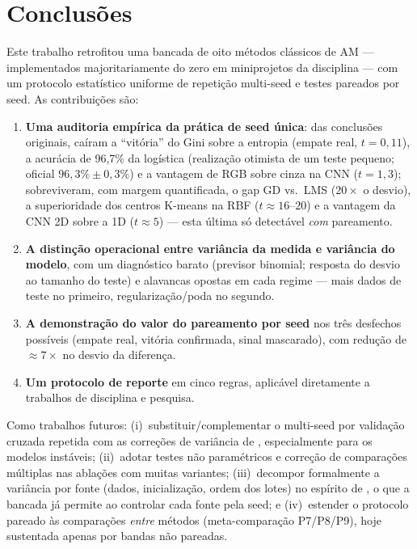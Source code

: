 \documentclass[12pt]{article}
\begin{document}
\section{Conclusões}\label{sec:conc}

Este trabalho retrofitou uma bancada de oito métodos clássicos de AM ---
implementados majoritariamente do zero em miniprojetos da disciplina --- com
um protocolo estatístico uniforme de repetição multi-seed e testes pareados
por seed. As contribuições são:

\begin{enumerate}
  \item \textbf{Uma auditoria empírica da prática de seed única}: das
        conclusões originais, caíram a ``vitória'' do Gini sobre a entropia
        (empate real, $t=0{,}11$), a acurácia de 96{,}7\% da logística
        (realização otimista de um teste pequeno; oficial $96{,}3\% \pm
        0{,}3\%$) e a vantagem de RGB sobre cinza na CNN ($t=1{,}3$);
        sobreviveram, com margem quantificada, o gap GD vs.\ LMS
        ($20\times$ o desvio), a superioridade dos centros K-means na RBF
        ($t \approx 16$--$20$) e a vantagem da CNN 2D sobre a 1D
        ($t \approx 5$) --- esta última só detectável \emph{com} pareamento.
  \item \textbf{A distinção operacional entre variância da medida e
        variância do modelo}, com um diagnóstico barato (previsor binomial;
        resposta do desvio ao tamanho do teste) e alavancas opostas em cada
        regime --- mais dados de teste no primeiro, regularização/poda no
        segundo.
  \item \textbf{A demonstração do valor do pareamento por seed} nos três
        desfechos possíveis (empate real, vitória confirmada, sinal
        mascarado), com redução de $\approx 7\times$ no desvio da diferença.
  \item \textbf{Um protocolo de reporte} em cinco regras, aplicável
        diretamente a trabalhos de disciplina e pesquisa.
\end{enumerate}

Como trabalhos futuros: (i)~substituir/complementar o multi-seed por
validação cruzada repetida com as correções de variância de
\cite{nadeau2003}, especialmente para os modelos instáveis; (ii)~adotar
testes não paramétricos e correção de comparações múltiplas
\cite{demsar2006} nas ablações com muitas variantes; (iii)~decompor
formalmente a variância por fonte (dados, inicialização, ordem dos lotes) no
espírito de \cite{bouthillier2021}, o que a bancada já permite ao controlar
cada fonte pela seed; e (iv)~estender o protocolo pareado às comparações
\emph{entre} métodos (meta-comparação P7/P8/P9), hoje sustentada apenas por
bandas não pareadas.
\end{document}
